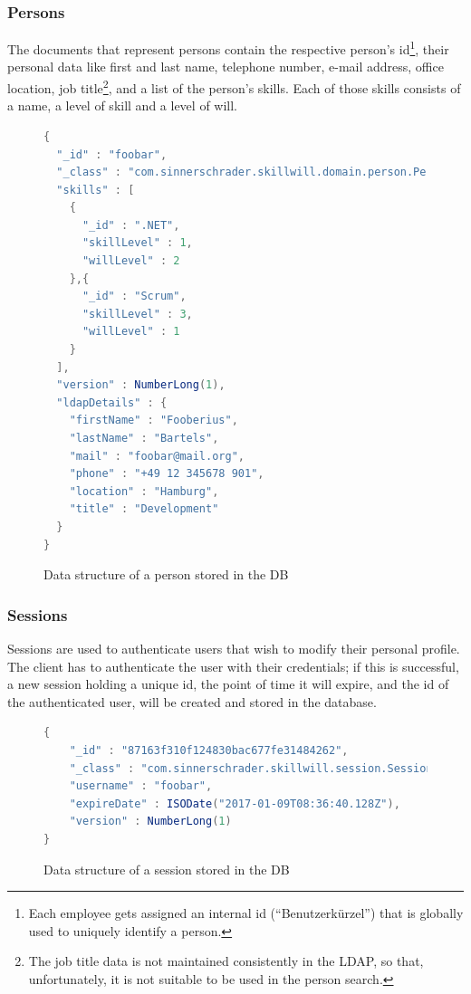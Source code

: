 \subsubsection{Persons}
\label{db:person}
The documents that represent persons contain the respective person's id\footnote{Each employee gets assigned an internal id (``Benutzerkürzel'') that is globally used to uniquely identify a person.}, their personal data like first and last name, telephone number, e-mail address, office location, job title\footnote{The job title data is not maintained consistently in the LDAP, so that, unfortunately, it is not suitable to be used in the person search.}, and a list of the person's skills. Each of those skills consists of a name, a level of skill and a level of will.

\begin{figure}
\begin{lstlisting}[language=Java]
{
  "_id" : "foobar",
  "_class" : "com.sinnerschrader.skillwill.domain.person.Person",
  "skills" : [
    {
      "_id" : ".NET",
      "skillLevel" : 1,
      "willLevel" : 2
    },{
      "_id" : "Scrum",
      "skillLevel" : 3,
      "willLevel" : 1
    }
  ],
  "version" : NumberLong(1),
  "ldapDetails" : {
    "firstName" : "Fooberius",
    "lastName" : "Bartels",
    "mail" : "foobar@mail.org",
    "phone" : "+49 12 345678 901",
    "location" : "Hamburg",
    "title" : "Development"
  }
}
\end{lstlisting}
\caption[Person (DB Data Structure)]{Data structure of a person stored in the DB}
\end{figure}

\subsubsection{Sessions}
Sessions are used to authenticate users that wish to modify their personal profile. The client has to authenticate the user with their credentials; if this is successful, a new session holding a unique id, the point of time it will expire, and the id of the authenticated user, will be created and stored in the database.

\begin{figure}
\begin{lstlisting}[language=Java]
{
	"_id" : "87163f310f124830bac677fe31484262",
	"_class" : "com.sinnerschrader.skillwill.session.Session",
	"username" : "foobar",
	"expireDate" : ISODate("2017-01-09T08:36:40.128Z"),
	"version" : NumberLong(1)
}
\end{lstlisting}
\caption[Session (DB Data Structure)]{Data structure of a session stored in the DB}
\end{figure}

